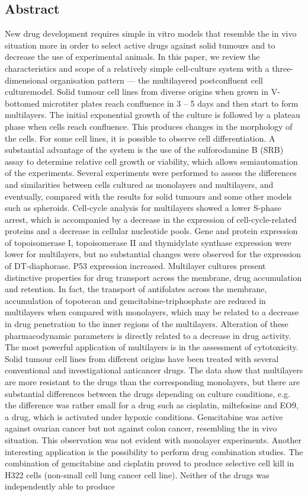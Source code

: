 \documentclass[11pt,a4paper]{article}
\begin{document}
\subsection*{Abstract}
New drug development requires simple in vitro models that resemble the in vivo situation more in order to select active drugs against solid tumours and to decrease the use of experimental animals. In this paper, we review the characteristics and scope of a relatively simple cell-culture system with a three-dimensional organisation pattern — the multilayered postconfluent cell culturemodel. Solid tumour cell lines from diverse origins when grown in V-bottomed microtiter plates reach confluence in 3 – 5 days and then start to form multilayers. The initial exponential growth of the culture is followed by a plateau phase when cells reach confluence. This produces changes in the morphology of the cells. For some cell lines, it is possible to observe cell differentiation. A substantial advantage of the system is the use of the sulforodamine B (SRB) assay to determine relative cell growth or viability, which allows semiautomation of the experiments. Several experiments were performed to assess the differences and similarities between cells cultured as monolayers and multilayers, and eventually, compared with the results for solid tumours and some other models such as spheroids. Cell-cycle analysis for multilayers showed a lower S-phase arrest, which is accompanied by a decrease in the expression of cell-cycle-related proteins and a decrease in cellular nucleotide pools. Gene and protein expression of topoisomerase I, topoisomerase II and thymidylate synthase expression were lower for multilayers, but no substantial changes were observed for the expression of DT-diaphorase. P53 expression increased. Multilayer cultures present distinctive properties for drug transport across the membrane, drug accumulation and retention. In fact, the transport of antifolates across the membrane, accumulation of topotecan and gemcitabine-triphosphate are reduced in multilayers when compared with monolayers, which may be related to a decrease in drug penetration to the inner regions of the multilayers. Alteration of these pharmacodynamic parameters is directly related to a decrease in drug activity. The most powerful application of multilayers is in the assessment of cytotoxicity. Solid tumour cell lines from different origins have been treated with several conventional and investigational anticancer drugs. The data show that multilayers are more resistant to the drugs than the corresponding monolayers, but there are substantial differences between the drugs depending on culture conditions, e.g. the difference was rather small for a drug such as cisplatin, miltefosine and EO9, a drug, which is activated under hypoxic conditions. Gemcitabine was active against ovarian cancer but not against colon cancer, resembling the in vivo situation. This observation was not evident with monolayer experiments. Another interesting application is the possibility to perform drug combination studies. The combination of gemcitabine and cisplatin proved to produce selective cell kill in H322 cells (non-small cell lung cancer cell line). Neither of the drugs was independently able to produce 
\end{document}
